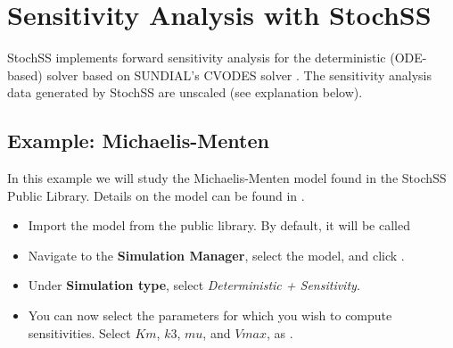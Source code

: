 \chapter{Sensitivity Analysis with StochSS}

%

StochSS implements forward sensitivity analysis for the deterministic (ODE-based) solver based on SUNDIAL's CVODES solver \cite{sundials}. The sensitivity analysis data generated by StochSS are unscaled (see explanation below).

\section{Example: Michaelis-Menten}

In this example we will study the Michaelis-Menten model found in the StochSS Public Library. Details on the model can be found in \cite{wiki-michaelis-menten}.%
\begin{itemize}
\item Import the model from the public library. By default, it will be called 
\item Navigate to the \textbf{Simulation Manager}, select the model, and click .
\item Under \textbf{Simulation type}, select \textit{Deterministic + Sensitivity}.
\item You can now select the parameters for which you wish to compute sensitivities. Select $Km$, $k3$, $mu$, and $Vmax$, as .
\end{itemize}

